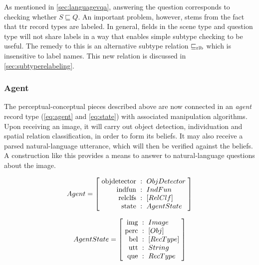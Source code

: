 As mentioned in \autoref{sec:languagevqa}, answering the question corresponds to checking whether $S \sqsubseteq Q$.
An important problem, however, stems from the fact that \gls{ttr} record types are labeled.
In general, fields in the scene type and question type will not share labels in a way that enables simple subtype checking to be useful.
The remedy to this is an alternative subtype relation $\mathrel{\sqsubseteq_\text{rlb}}$ which is insensitive to label names.
This new relation is discussed in \autoref{sec:subtyperelabeling}.



\subsubsection{Agent}
\label{sec:agent}

The perceptual-conceptual pieces described above are now connected in an \textit{agent} record type (\autoref{eq:agent} and \autoref{eq:state}) with associated manipulation algorithms.
Upon receiving an image, it will carry out object detection, individuation and spatial relation classification, in order to form its beliefs.
It may also receive a parsed natural-language utterance, which will then be verified against the beliefs.
A construction like this provides a means to answer to natural-language questions about the image.

\begin{equation}\label{eq:agent}
Agent = \rec{
    \text{objdetector} &:& ObjDetector \\
    \text{indfun} &:& IndFun \\
    \text{relclfs} &:& [RelClf] \\
    \text{state} &:& AgentState \\
    }
\end{equation}

\begin{equation}\label{eq:state}
AgentState = \rec{
    \text{img} &:& Image \\
    \text{perc} &:& [Obj] \\
    \text{bel} &:& [RecType] \\
    \text{utt} &:& String \\
    \text{que} &:& RecType \\
    }
\end{equation}

